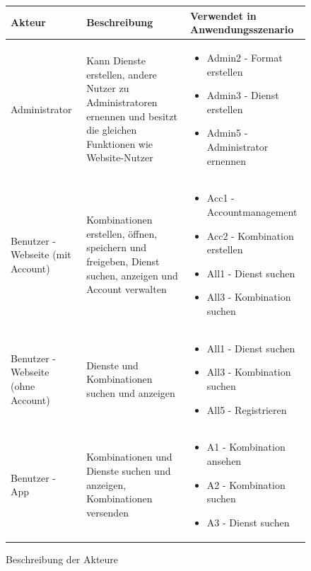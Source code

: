 
\begin{figure}[h]
	\centering

	\begin{tabularx}{\textwidth}{ p{} | p{} | X }
		\textbf{Akteur} & \textbf{Beschreibung} & \textbf{Verwendet in Anwendungsszenario} \\ \hline
		Administrator & Kann Dienste erstellen, andere Nutzer zu Administratoren ernennen und besitzt die gleichen Funktionen wie Website-Nutzer &
			\begin{itemize}
        \item Admin2 - Format erstellen
        \item Admin3 - Dienst erstellen
        \item Admin5 - Administrator ernennen
			\end{itemize} \\ \hline
		Benutzer - Webseite (mit Account) & Kombinationen erstellen, öffnen, speichern und freigeben, Dienst suchen, anzeigen und Account verwalten &
			\begin{itemize}
				\item Acc1 - Accountmanagement
				\item Acc2 - Kombination erstellen
				\item All1 - Dienst suchen
				\item All3 - Kombination suchen
			\end{itemize} \\ \hline
		Benutzer - Webseite (ohne Account) & Dienste und Kombinationen suchen und anzeigen &
			\begin{itemize}
				\item All1 - Dienst suchen
				\item All3 - Kombination suchen
				\item All5 - Registrieren
			\end{itemize} \\ \hline
		Benutzer - App & Kombinationen und Dienste suchen und anzeigen, Kombinationen versenden &
			\begin{itemize}
				\item A1 - Kombination ansehen
        \item A2 - Kombination suchen
        \item A3 - Dienst suchen
			\end{itemize} \\ \hline
	\end{tabularx}

	\caption{Beschreibung der Akteure}
	\label{fig:akteur-tabelle}
\end{figure}


